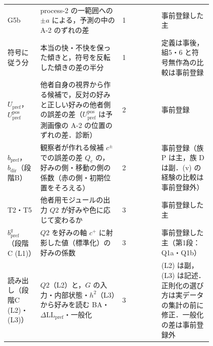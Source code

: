 \begin{tabular}{@{}p{0.16\linewidth}p{0.4\linewidth}llp{0.25\linewidth}@{}}
G5b & \multicolumn{2}{p{0.475\linewidth}}{process-2 の一範囲への $\pm a$ による，予測の中の A-2 のずれの差} & 1 & 事前登録した主 \\
符号に従う分 & \multicolumn{2}{p{0.475\linewidth}}{本当の快・不快を保った傾きと，符号を反転した傾きの差の半分} & 1 & 定義は事後，組5・6 と符号無作為の比較は事前登録 \\
$U_{\mathrm{pref}}$，$U^{\mathrm{pos}}_{\mathrm{pref}}$ & \multicolumn{2}{p{0.475\linewidth}}{他者自身の視界から作る候補で，反対の好みと正しい好みの他者側の誤差の差（$U^{\mathrm{pos}}_{\mathrm{pref}}$ は予測画像の A-2 の位置のずれの差．診断）} & 2 & 事前登録 \\
$b_{\mathrm{pref}}$，$b_{\mathrm{dir}}$（段階B） & \multicolumn{2}{p{0.475\linewidth}}{観察者が作れる候補 $c^{\pm}$ での誤差の差 $Q_e$ の，好みの側・移動の側の係数（赤の側・初期位置をそろえる）} & 2 & 事前登録（族 P は主，族 D は副．(v) の経験の比較は事前登録外） \\
T2・T5 & \multicolumn{2}{p{0.475\linewidth}}{他者用モジュールの出力 $Q2$ が好みや色に応じて変わるか} & 3 & 事前登録した主 \\
$b^{q}_{\mathrm{pref}}$（段階C (L1)） & \multicolumn{2}{p{0.475\linewidth}}{$Q2$ を好みの軸 $c^{+}$ に射影した値（標準化）の好みの係数} & 3 & 事前登録した主（第1段：Q1a・Q1b） \\
読み出し（段階C (L2)・(L3)） & \multicolumn{2}{p{0.475\linewidth}}{$Q2$（L2）と，$G$ の入力・内部状態・$h^2$（L3）から好みを読む BA・$\Delta\mathrm{LL}_{\mathrm{pref}}$・一般化} & 3 & (L2) は副，(L3) は記述．正則化の選び方は実データの集計の前に修正．一般化の差は事前登録外 \\
\bottomrule
\end{tabular}
